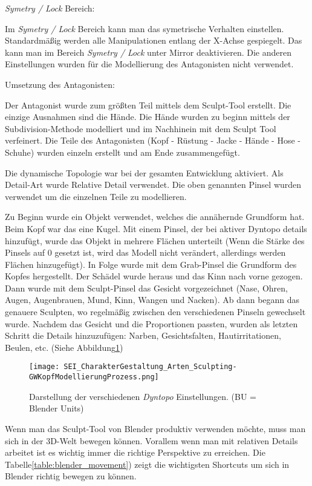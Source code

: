 \textit{Symetry / Lock} Bereich\citep{blender:sym_lock}:

Im \textit{Symetry / Lock} Bereich kann man das symetrische Verhalten einstellen. Standardmäßig werden alle
Manipulationen entlang der X-Achse gespiegelt. Das kann man im Bereich \textit{Symetry / Lock} unter Mirror
deaktivieren. Die anderen Einstellungen wurden für die Modellierung des Antagonisten nicht verwendet.



Umsetzung des Antagonisten:

Der Antagonist wurde zum größten Teil mittels dem Sculpt-Tool erstellt. Die einzige Ausnahmen sind die Hände. Die
Hände wurden zu beginn mittels der Subdivision-Methode modelliert und im Nachhinein mit dem Sculpt Tool verfeinert. Die Teile des
Antagonisten (Kopf - Rüstung - Jacke - Hände - Hose - Schuhe) wurden einzeln erstellt und am Ende zusammengefügt.

Die dynamische Topologie war bei der gesamten Entwicklung aktiviert. Als Detail-Art wurde Relative Detail
verwendet. Die oben genannten Pinsel wurden verwendet um die einzelnen Teile zu modellieren.

Zu Beginn wurde ein Objekt verwendet, welches die annähernde Grundform hat. Beim Kopf war das eine Kugel. Mit
einem Pinsel, der bei aktiver Dyntopo details hinzufügt, wurde das Objekt in mehrere Flächen unterteilt (Wenn die
Stärke des Pinsels auf 0 gesetzt ist, wird das Modell nicht verändert, allerdings werden Flächen hinzugefügt). In Folge
wurde mit dem Grab-Pinsel die Grundform des Kopfes hergestellt. Der Schädel wurde heraus und
das Kinn nach vorne gezogen. Dann wurde mit dem Sculpt-Pinsel das Gesicht vorgezeichnet (Nase, Ohren,
Augen, Augenbrauen, Mund, Kinn, Wangen und Nacken). Ab dann begann das genauere Sculpten, wo regelmäßig zwischen den
verschiedenen Pinseln gewechselt wurde. Nachdem das Gesicht und die Proportionen passten, wurden als letzten Schritt
die Details hinzuzufügen: Narben, Gesichtsfalten, Hautirritationen, Beulen, etc. (Siehe Abbildung\ref{picture:antagonist_process})

\begin{figure}[H]
    \centering
    \texttt{[image: SEI\_CharakterGestaltung\_Arten\_Sculpting-GWKopfModellierungProzess.png]}
    \caption{Darstellung der verschiedenen \textit{Dyntopo} Einstellungen. (BU = Blender Units)}
    \label{picture:antagonist_process}
\end{figure}

Wenn man das Sculpt-Tool von Blender produktiv verwenden möchte, muss man sich in der 3D-Welt bewegen
können. Vorallem wenn man mit relativen Details arbeitet ist es wichtig immer die richtige Perspektive zu erreichen.
Die Tabelle\ref{table:blender_movement}) zeigt die wichtigsten Shortcuts um sich in Blender richtig bewegen zu können.

